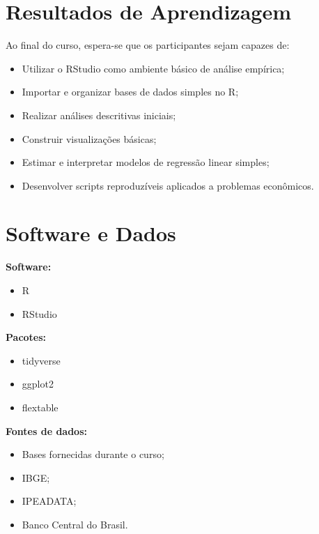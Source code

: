 \documentclass[12pt,a4paper]{article}
\begin{document}
	\section*{Resultados de Aprendizagem}
	
	Ao final do curso, espera-se que os participantes sejam capazes de:
	
	\begin{itemize}
		\item Utilizar o RStudio como ambiente básico de análise empírica;
		
		\item Importar e organizar bases de dados simples no R;
		
		\item Realizar análises descritivas iniciais;
		
		\item Construir visualizações básicas;
		
		\item Estimar e interpretar modelos de regressão linear simples;
		
		\item Desenvolver scripts reproduzíveis aplicados a problemas econômicos.
	\end{itemize}
	
	\section*{Software e Dados}
	
	\textbf{Software:}
	\begin{itemize}
		\item R
		\item RStudio
	\end{itemize}
	
	\textbf{Pacotes:}
	\begin{itemize}
		\item tidyverse
		\item ggplot2
		\item flextable
	\end{itemize}
	
	\textbf{Fontes de dados:}
	\begin{itemize}
		\item Bases fornecidas durante o curso;
		\item IBGE;
		\item IPEADATA;
		\item Banco Central do Brasil.
	\end{itemize}
	
\end{document}
